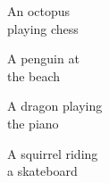 \begin{figure*}[h]
\vspace{1ex}
\begin{minipage}[t]{0.98\figwidth}
    \vspace{2mm}
    \begin{minipage}[t]{0.25\columnwidth}
        \centering
        An octopus\\playing chess
    \end{minipage}%
    \begin{minipage}[t]{0.25\columnwidth}
        \centering
        A penguin at\\the beach
    \end{minipage}%
    \begin{minipage}[t]{0.25\columnwidth}
        \centering
        A dragon playing\\the piano
    \end{minipage}%
    \begin{minipage}[t]{0.25\columnwidth}
        \centering
        A squirrel riding\\a skateboard
    \end{minipage}%
\end{minipage}


\end{figure*}
